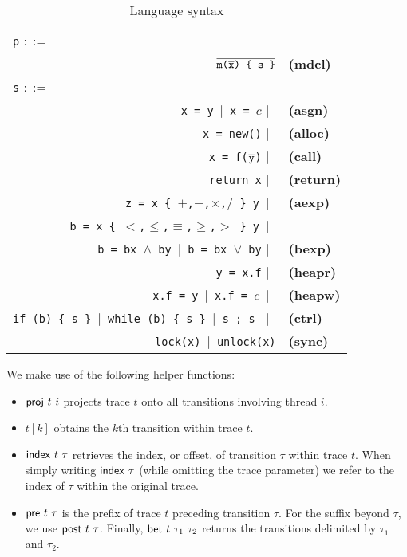 \begin{table}
	\begin{center}
		\begin{tabular}{rl}
			\multicolumn{1}{l}{{\tt p} $::=$} & \\
			$\overline{\texttt{m($\overline{{\tt x}}$) \{ s \}}}$ & {\bf (mdcl)} \\
			\multicolumn{1}{l}{{\tt s} $::=$} & \\
			{\tt x = y}\ $|$\ {\tt x = $c$} $|$\ & {\bf (asgn)} \\
			{\tt x = new()} $|$\ & {\bf (alloc)} \\
			{\tt x = f($\overline{{\tt y}}$)} $|$\ & {\bf (call)} \\
			{\tt return x} $|$\ & {\bf (return)} \\
			{\tt z = x \{ $+$,$-$,$\times$,$/$ \} y}\ $|$\ & {\bf (aexp)} \\
			{\tt b = x \{ $<$,$\leq$,$\equiv$,$\geq$,$>$ \} y}\ $|$\ & \\
			{\tt b = bx $\wedge$ by}\ $|$\ {\tt b = bx $\vee$ by} $|$\ & {\bf (bexp)} \\
			{\tt y = x.f} $|$\ & {\bf (heapr)} \\ 
			{\tt x.f = y}\ $|$\ {\tt x.f = $c$}\ $|$\ & {\bf (heapw)} \\
			{\tt if (b) \{ s \} $|$\ {\tt while (b) \{  s \}} $|$\ {\tt s ; s }} $|$\ & {\bf (ctrl)} \\
			{\tt lock(x)}\ $|$\ {\tt unlock(x)} & {\bf (sync)}
		\end{tabular}
	\end{center}
	\caption{\label{Ta:syntax}Language syntax}
\end{table}

We make use of the following helper functions:
\begin{itemize}
	\item ${\sf proj}\ t\ i$ projects trace $t$ onto all transitions involving thread $i$.
	\item $t[k]$ obtains the $k$th transition within trace $t$.
	\item ${\sf index}\ t\ \tau$ retrieves the index, or offset, of transition $\tau$ within trace $t$. When simply writing
	${\sf index}\ \tau$ (while omitting the trace parameter) we refer to the index of $\tau$ within the original trace. 
	\item ${\sf pre}\ t\ \tau$ is the prefix of trace $t$ preceding transition $\tau$. For the suffix beyond $\tau$, we 
	use ${\sf post}\ t\ \tau$. Finally, ${\sf bet}\ t\ \tau_1\ \tau_2$ returns the transitions delimited by $\tau_1$ and $\tau_2$.
\end{itemize}

